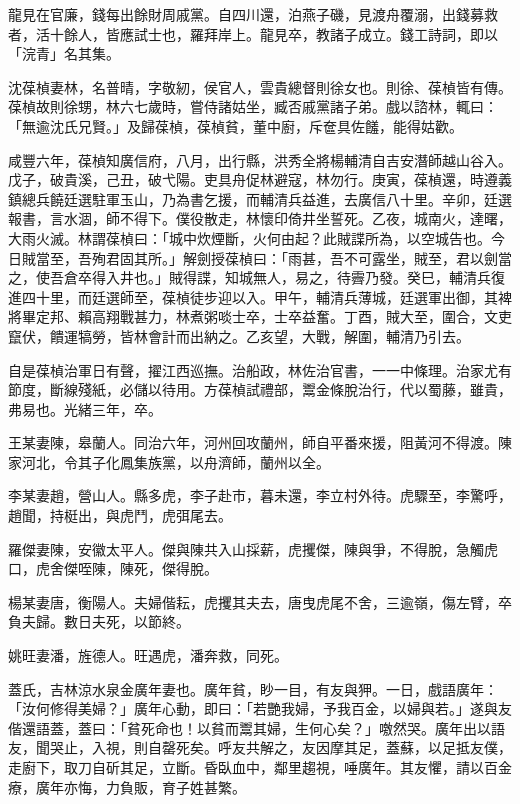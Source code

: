 \begin{pinyinscope}
龍見在官廉，錢每出餘財周戚黨。自四川還，泊燕子磯，見渡舟覆溺，出錢募救者，活十餘人，皆應試士也，羅拜岸上。龍見卒，教諸子成立。錢工詩詞，即以「浣青」名其集。

沈葆楨妻林，名普晴，字敬紉，侯官人，雲貴總督則徐女也。則徐、葆楨皆有傳。葆楨故則徐甥，林六七歲時，嘗侍諸姑坐，臧否戚黨諸子弟。戲以諮林，輒曰：「無逾沈氏兄賢。」及歸葆楨，葆楨貧，董中廚，斥奩具佐饈，能得姑歡。

咸豐六年，葆楨知廣信府，八月，出行縣，洪秀全將楊輔清自吉安潛師越山谷入。戊子，破貴溪，己丑，破弋陽。吏具舟促林避寇，林勿行。庚寅，葆楨還，時遵義鎮總兵饒廷選駐軍玉山，乃為書乞援，而輔清兵益進，去廣信八十里。辛卯，廷選報書，言水涸，師不得下。僕役散走，林懷印倚井坐誓死。乙夜，城南火，達曙，大雨火滅。林謂葆楨曰：「城中炊煙斷，火何由起？此賊諜所為，以空城告也。今日賊當至，吾殉君固其所。」解劍授葆楨曰：「雨甚，吾不可露坐，賊至，君以劍當之，使吾倉卒得入井也。」賊得諜，知城無人，易之，待霽乃發。癸巳，輔清兵復進四十里，而廷選師至，葆楨徒步迎以入。甲午，輔清兵薄城，廷選軍出御，其裨將畢定邦、賴高翔戰甚力，林煮粥啖士卒，士卒益奮。丁酉，賊大至，圍合，文吏竄伏，饋運犒勞，皆林會計而出納之。乙亥望，大戰，解圍，輔清乃引去。

自是葆楨治軍日有聲，擢江西巡撫。治船政，林佐治官書，一一中條理。治家尤有節度，斷線殘紙，必儲以待用。方葆楨試禮部，鬻金條脫治行，代以蜀藤，雖貴，弗易也。光緒三年，卒。

王某妻陳，皋蘭人。同治六年，河州回攻蘭州，師自平番來援，阻黃河不得渡。陳家河北，令其子化鳳集族黨，以舟濟師，蘭州以全。

李某妻趙，營山人。縣多虎，李子赴市，暮未還，李立村外待。虎驟至，李驚呼，趙聞，持梃出，與虎鬥，虎弭尾去。

羅傑妻陳，安徽太平人。傑與陳共入山採薪，虎攫傑，陳與爭，不得脫，急觸虎口，虎舍傑咥陳，陳死，傑得脫。

楊某妻唐，衡陽人。夫婦偕耘，虎攫其夫去，唐曳虎尾不舍，三逾嶺，傷左臂，卒負夫歸。數日夫死，以節終。

姚旺妻潘，旌德人。旺遇虎，潘奔救，同死。

蓋氏，吉林涼水泉金廣年妻也。廣年貧，眇一目，有友與狎。一日，戲語廣年：「汝何修得美婦？」廣年心動，即曰：「若艷我婦，予我百金，以婦與若。」遂與友偕還語蓋，蓋曰：「貧死命也！以貧而鬻其婦，生何心矣？」噭然哭。廣年出以語友，聞哭止，入視，則自罄死矣。呼友共解之，友因摩其足，蓋蘇，以足抵友僕，走廚下，取刀自斫其足，立斷。昏臥血中，鄰里趨視，唾廣年。其友懼，請以百金療，廣年亦悔，力負販，育子姓甚繁。


\end{pinyinscope}